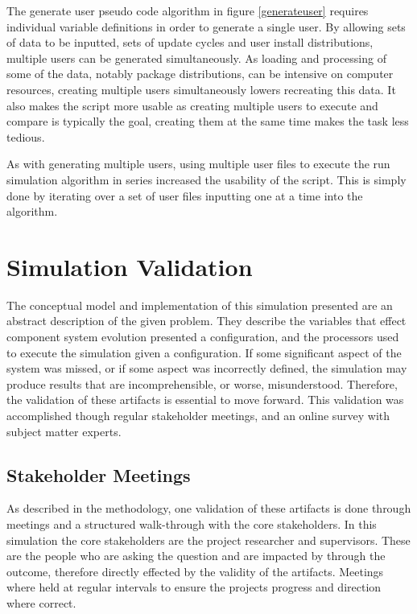 The generate user pseudo code algorithm in figure \ref{generateuser} requires individual variable definitions in order to generate a single user.
By allowing sets of data to be inputted, sets of update cycles and user install distributions, multiple users can be generated simultaneously.
As loading and processing of some of the data, notably package distributions, can be intensive on computer resources, 
creating multiple users simultaneously lowers recreating this data.
It also makes the script more usable as creating multiple users to execute and compare is typically the goal,
creating them at the same time makes the task less tedious.

As with generating multiple users, using multiple user files to execute the run simulation algorithm in series increased the usability of the script.
This is simply done by iterating over a set of user files inputting one at a time into the algorithm.   

\section{Simulation Validation}
The conceptual model and implementation of this simulation presented are an abstract description of the given problem.
They describe the variables that effect component system evolution presented a configuration,
and the processors used to execute the simulation given a configuration.
If some significant aspect of the system was missed, or if some aspect was incorrectly defined, the simulation may produce results that are incomprehensible,
or worse, misunderstood.
Therefore, the validation of these artifacts is essential to move forward. 
This validation was accomplished though regular stakeholder meetings, and an online survey with subject matter experts.

\subsection{Stakeholder Meetings}
As described in the methodology, one validation of these artifacts is done through meetings and a structured walk-through with the core stakeholders.
In this simulation the core stakeholders are the project researcher and supervisors.
These are the people who are asking the question and are impacted by through the outcome, therefore directly effected by the validity of the artifacts.
Meetings where held at regular intervals to ensure the projects progress and direction where correct.

